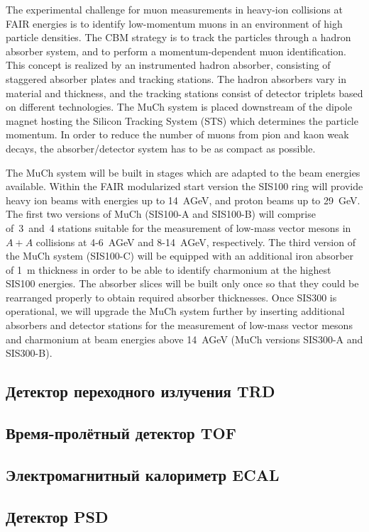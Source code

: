 The experimental challenge for muon measurements in heavy-ion collisions at FAIR energies is to identify low-momentum muons in an environment of high particle densities. The CBM strategy is to track the particles through a hadron absorber system, and to perform a momentum-dependent muon identification. This concept is realized by an instrumented hadron absorber, consisting of staggered absorber plates and tracking stations. The hadron absorbers vary in material and thickness, and the tracking stations consist of detector triplets based on different technologies. The MuCh system is placed downstream of the dipole magnet hosting the Silicon Tracking System (STS) which determines the particle momentum. In order to reduce the number of muons from pion and kaon weak decays, the absorber/detector system has to be as compact as possible.

The MuCh system will be built in stages which are adapted to the beam energies available. Within the FAIR modularized start version the SIS100 ring will provide heavy ion beams with energies up to 14~AGeV, and proton beams up to 29~GeV. The first two versions of MuCh (SIS100-A and SIS100-B) will comprise of~3~and~4 stations suitable for the measurement of low-mass vector mesons in $ A + A $ collisions at 4-6~AGeV and 8-14~AGeV, respectively. The third version of the MuCh system (SIS100-C) will be equipped with an additional iron absorber of 1~m thickness in order to be able to identify charmonium at the highest SIS100 energies. The absorber slices will be built only once so that they could be rearranged properly to obtain required absorber thicknesses. Once SIS300 is operational, we will upgrade the MuCh system further by inserting additional absorbers and detector stations for the measurement of low-mass vector mesons and charmonium at beam energies above 14~AGeV (MuCh versions SIS300-A and SIS300-B).

\subsection{Детектор переходного излучения TRD}\label{sec:secTRD}

\subsection{Время-пролётный детектор TOF}\label{sec:secTOF}

\subsection{Электромагнитный калориметр ECAL}\label{sec:secECAL}

\subsection{Детектор PSD}\label{sec:secPSD}
